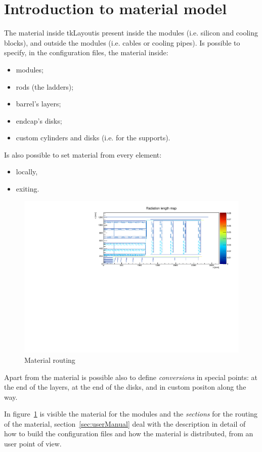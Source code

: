 \documentclass[12pt, a4paper]{article}
\newcommand{\tkl}{tkLayout}
\begin{document}
\section{Introduction to material model}
The material inside \tkl is present inside the modules (i.e. silicon
and cooling blocks),
and outside the modules (i.e. cables or cooling pipes). Is possible to
specify, in the configuration files, the material inside:
\begin{itemize}
\item modules;
\item rods (the ladders);
\item barrel's layers;
\item endcap's disks;
\item custom cylinders and disks (i.e. for the supports).
\end{itemize}
Is also possible to set material from every element:
\begin{itemize}
\item locally,
\item exiting.
\end{itemize}

\begin{figure}[hbtp]
  \centering
  \includegraphics[width=\textwidth]{img/materialMap.pdf}  
  \caption{Material routing}
  \label{fig:materialMap}
\end{figure}

Apart from the material is possible also to define \emph{conversions}
in special points: at the end of the layers, at the end of the disks,
and in custom positon along the way.

In figure~\ref{fig:materialMap}
is visible the material for the modules and the \emph{sections} for
the routing of the material, section~\ref{sec:userManual} deal with
the description in detail of how to build the configuration files and
how the material is distributed, from an user point of view.
\end{document}
